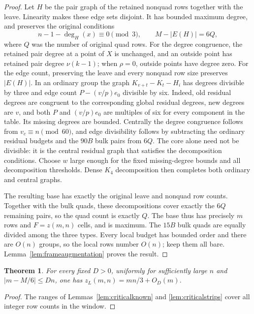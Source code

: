 \documentclass[11pt]{article}
\newtheorem{theorem}{Theorem}
\newcommand{\zl}{z_L}
\begin{document}
\begin{proof}
Let $H$ be the pair graph of the retained nonquad rows together with
the leave. Linearity makes these edge sets disjoint. It has bounded
maximum degree, and preserves the original
conditions
\[
 n-1-\deg_H(x)\equiv0\pmod3,
 \qquad M-|E(H)|=6Q,
\]
where $Q$ was the number of original quad rows.
For the degree congruence, the retained pair degree at a point of $X$
is unchanged, and an outside point has retained pair degree
$\nu(k-1)$; when $\rho=0$, outside points have degree zero.
For the edge count, preserving the leave and every nonquad row size
preserves $|E(H)|$.
In an ordinary group the graph $K_{v+t}-K_t-H_i$ has degrees divisible
by three and edge count $P-(v/p)e_0$ divisible by six.
Indeed, old residual degrees are congruent to the corresponding global
residual degrees, new degrees are $v$, and both $P$ and $(v/p)e_0$ are
multiples of six for every component in the table.
Its missing degrees are bounded. Centrally the degree congruence follows
from $v_c\equiv n\pmod{60}$, and edge divisibility follows by subtracting
the ordinary residual budgets and the $90B$ bulk pairs from $6Q$.
The core alone need not be divisible: it is the central residual graph
that satisfies the decomposition conditions. Choose $w$ large enough
for the fixed missing-degree bounds and all decomposition thresholds.
Dense $K_4$ decomposition then completes both ordinary and central graphs.

The resulting base has exactly the original leave and nonquad row counts.
Together with the bulk quads, these decompositions cover exactly the
$6Q$ remaining pairs, so the quad count is exactly $Q$. The base thus
has precisely $m$ rows and $F=z(m,n)$ cells, and is maximum.
The $15B$ bulk quads are equally divided among the three types.
Every local budget has bounded order and there are $O(n)$ groups, so
the local rows number $O(n)$; keep them all bare.
Lemma~\ref{lem:frameaugmentation} proves the result.
\end{proof}

\begin{theorem}\label{thm:criticallinear}
For every fixed $D>0$, uniformly for sufficiently large $n$ and
$|m-M/6|\le Dn$, one has $\zl(m,n)=mn/3+O_D(m)$.
\end{theorem}
\begin{proof}
The ranges of Lemmas~\ref{lem:criticalknown} and
\ref{lem:criticalstrips} cover all integer row counts in the window.
\end{proof}
\end{document}
